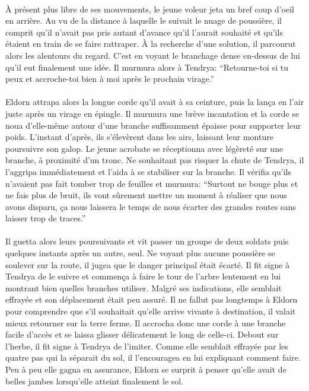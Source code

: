 \paragraph{}
À présent plus libre de ses mouvements, le jeune voleur jeta un bref coup
d'oeil en arrière. Au vu de la distance à laquelle le suivait le nuage de
poussière, il comprit qu'il n'avait pas pris autant d'avance qu'il l'aurait
souhaité et qu'ils étaient en train de se faire rattraper. À la recherche
d'une solution, il parcourut alors les alentours du regard. C'est en voyant
le branchage dense en-dessus de lui qu'il eut finalement une idée. Il murmura
alors à Tendrya: ``Retourne-toi si tu peux et accroche-toi bien à moi après
le prochain virage.''

\paragraph{}%
Eldorn attrapa alors la longue corde qu'il avait à sa ceinture, puis la lança
en l'air juste après un virage en épingle. Il murmura une brève incantation
et la corde se noua d'elle-même autour d'une branche suffisamment épaisse
pour supporter leur poids. L'instant d'après, ils s'élevèrent dans les airs,
laissant leur monture poursuivre son galop. Le jeune acrobate se réceptionna
avec légèreté sur une branche, à proximité d'un tronc. Ne souhaitant pas
risquer la chute de Tendrya, il l'aggripa immédiatement et l'aida à se
stabiliser sur la branche. Il vérifia qu'ils n'avaient pas fait tomber trop
de feuilles et murmura: ``Surtout ne bouge plus et ne fais plus de bruit,
ils vont sûrement mettre un moment à réaliser que nous avons disparu, ça
nous laissera le temps de nous écarter des grandes routes sans laisser trop
de traces.''

\paragraph{}
Il guetta alors leurs poursuivants et vit passer un groupe de deux soldats
puis quelques instants après un autre, seul. Ne voyant plus aucune poussière
se soulever sur la route, il jugea que le danger principal était écarté. Il
fit signe à Tendrya de le suivre et commença à faire le tour de l'arbre
lentement en lui montrant bien quelles branches utiliser. Malgré ses
indications, elle semblait effrayée et son déplacement était peu assuré. Il
ne fallut pas longtemps à Eldorn pour comprendre que s'il souhaitait qu'elle
arrive vivante à destination, il valait mieux retourner sur la terre ferme.
Il accrocha donc une corde à une branche facile d'accès et se laissa glisser
délicatement le long de celle-ci. Debout sur l'herbe, il fit signe à Tendrya
de l'imiter. Comme elle semblait effrayée par les quatre pas qui la séparait
du sol, il l'encouragea en lui expliquant comment faire. Peu à peu elle
gagna en assurance, Eldorn se surprit à penser qu'elle avait de belles jambes
lorsqu'elle atteint finalement le sol.

